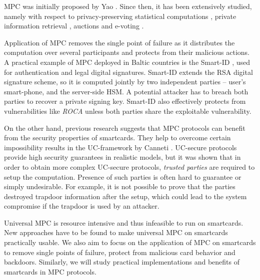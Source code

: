 \documentclass[
  digital, %
  twoside, %
  table,   %
  lof,     %
  lot,     %
]{fithesis3}
\newcounter{ph4_show_guides}
\theoremstyle{definition}
\theoremstyle{remark}
\begin{document}
MPC was initially proposed by Yao \cite{yao82}. Since then, it has been extensively studied, namely with respect to privacy-preserving statistical computations \cite{BJSV15, BKKRST16}, private information retrieval \cite{Bertino2005, Naor:1999:PPA:336992.337028}, auctions \cite{Bogetoft:2006:PIS:2165197.2165211} and e-voting \cite{DBLP:journals/corr/NairBK15}.

Application of MPC removes the single point of failure as it distributes the computation over several participants and protects from their malicious actions. A practical example of MPC deployed in Baltic countries is the Smart-ID \cite{smart_id_ee}, used for authentication and legal digital signatures.
Smart-ID extends the RSA digital signature scheme, so it is computed jointly by two independent parties -- user's smart-phone, and the server-side HSM. A potential attacker has to breach both parties to recover a private signing key. Smart-ID also effectively protects from vulnerabilities like \emph{ROCA} unless both parties share the exploitable vulnerability.

On the other hand, previous research \cite{K07} suggests that MPC protocols can benefit from the security properties of smartcards. They help to overcome certain impossibility results in the UC-framework by Canneti \cite{Can01}.
UC-secure protocols provide high security guarantees in realistic models, but it was shown that in order to obtain more complex UC-secure protocols, \emph{trusted parties} are required to setup the computation. Presence of such parties is often hard to guarantee or simply undesirable. For example, it is not possible to prove that the parties destroyed trapdoor information after the setup, which could lead to the system compromise if the trapdoor is used by an attacker.

Universal MPC is resource intensive and thus infeasible to run on smartcards. New approaches have to be found to make universal MPC on smartcards practically usable.
We also aim to focus on the application of MPC on smartcards to remove single points of failure, protect from malicious card behavior and backdoors. Similarly, we will study practical implementations and benefits of smartcards in MPC protocols.

\end{document}
